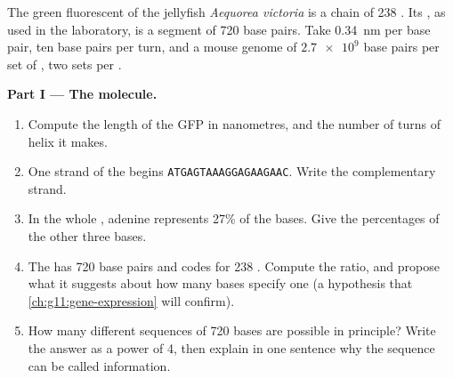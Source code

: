 \begin{problem}
\label{pb:g10:universal-dna:1}
The green fluorescent  of the jellyfish \emph{Aequorea victoria}
is a chain of 238 . Its , as used in the laboratory, is
a  segment of 720 base pairs. Take \qty{0.34}{nm} per base pair, ten
base pairs per turn, and a mouse genome of $\num{2.7e9}$ base pairs per
set of , two sets per .

\medskip
\noindent\textbf{Part I --- The molecule.}
\begin{enumerate}
  \item Compute the length of the GFP  in nanometres, and the
        number of turns of helix it makes.
  \item One strand of the  begins \texttt{ATGAGTAAAGGAGAAGAAC}.
        Write the complementary strand.
  \item In the whole , adenine represents 27\% of the bases. Give
        the percentages of the other three bases.
  \item The  has 720 base pairs and codes for 238 .
        Compute the ratio, and propose what it suggests about how many
        bases specify one  (a hypothesis that
        \cref{ch:g11:gene-expression} will confirm).
  \item How many different sequences of 720 bases are possible in
        principle? Write the answer as a power of 4, then explain in
        one sentence why the sequence can be called information.
\end{enumerate}


\end{problem}
